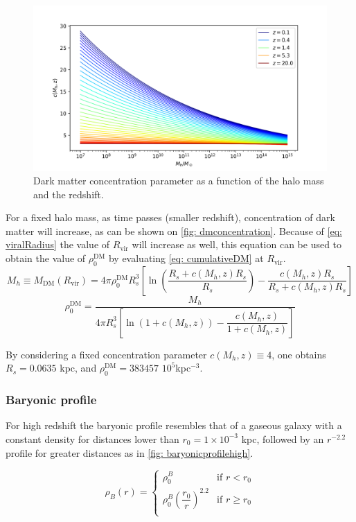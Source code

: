 		\begin{figure}[h]
			\centering
			\includegraphics[width=0.7\linewidth]{"../Files/Week 3/darkmatter_concentration"}
			\caption{Dark matter concentration parameter as a function of the halo mass and the redshift.}
			\label{fig: dmconcentration}
		\end{figure}
	
		For a fixed halo mass, as time passes (smaller redshift), concentration of dark matter will increase, as can be shown on \autoref{fig: dmconcentration}. Because of \autoref{eq: viralRadius} the value of $R_\text{vir}$ will increase as well, this equation can be used to obtain the value of $\rho_0^\text{DM}$ by evaluating \autoref{eq: cumulativeDM} at $R_\text{vir}$.
		\begin{equation}
			M_h \equiv M_\text{DM}(R_\text{vir}) = 4\pi\rho_0^\text{DM}R_s^3 \left[\ln\left(\dfrac{R_s + c(M_h, z)R_s}{R_s}\right) - \dfrac{c(M_h, z)R_s}{R_s + c(M_h, z)R_s}\right]
		\end{equation}
		\begin{equation}
			\rho_0^\text{DM} = \dfrac{M_h}{4\pi R_s^3 \left[\ln\left(1 + c(M_h, z)\right) - \dfrac{c(M_h, z)}{1 + c(M_h, z)}\right]}
		\end{equation}
		
		By considering a fixed concentration parameter $c(M_h, z) \equiv 4$, one obtains $R_s = 0.0635$ kpc, and $\rho_0^\text{DM} = 383457$ $10^5$\sm kpc$^{-3}$.
	
		\subsubsection{Baryonic profile}
			For high redshift the baryonic profile resembles that of a gaseous galaxy with a constant density for distances lower than $r_0 = 1\times10^{-3}$ kpc, followed by an $r^{-2.2}$ profile for greater distances as in \autoref{fig: baryonicprofilehigh}.
			
			\begin{equation}
				\rho_B(r) = \left \{
				\begin{matrix}
				\rho_0^B & \text{if $r < r_0$}\\
				\rho_0^B\left(\dfrac{r_0}{r}\right)^{2.2} & \text{if $r \geq r_0$}\\
				\end{matrix}
				\right.
			\end{equation}
			
